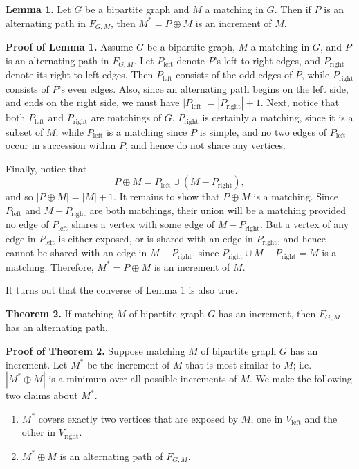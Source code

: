 \documentclass [12pt]{article}
\theoremstyle{definition}
\begin{document}
{\bf Lemma 1.} Let $G$ be a bipartite graph and $M$ a matching in $G$. Then if $P$ is an alternating path in $F_{G,M}$, then $M^{*}=P\oplus M$ is an increment of $M$.

{\bf Proof of Lemma 1.} Assume $G$ be a bipartite graph, $M$ a matching in $G$, and $P$ is an alternating path in $F_{G,M}$. 
 Let $P_{\mbox{left}}$ denote $P$'s left-to-right edges, and $P_{\mbox{right}}$ denote
its right-to-left edges. Then $P_{\mbox{left}}$ consists of the odd edges of $P$, while $P_{\mbox{right}}$ consists of $P$'s even edges. Also,
since an alternating path begins on the left side, and ends on the
right side, we must have  $|P_{\mbox{left}}|=|P_{\mbox{right}}|+1$. Next, notice that both $P_{\mbox{left}}$ and $P_{\mbox{right}}$ are matchings of $G$.  $P_{\mbox{right}}$ is certainly   a
matching, since it is  a subset of $M$, while $P_{\mbox{left}}$ is a matching since $P$ is simple, and no two edges of  $P_{\mbox{left}}$ occur in succession within $P$, and hence do not share any vertices.

Finally, notice that 
\[P\oplus M=P_{\mbox{left}}\cup (M-P_{\mbox{right}}),\]
and so $|P\oplus M|=|M|+1$. 
It remains to show that $P\oplus M$ is a matching. Since $P_{\mbox{left}}$ and $M-P_{\mbox{right}}$ are both matchings, their union will be a matching provided no edge of 
$P_{\mbox{left}}$ shares a vertex with some edge of  $M-P_{\mbox{right}}$. But a vertex of any edge in $P_{\mbox{left}}$ is either exposed, or is shared with an edge in $P_{\mbox{right}}$, and hence
cannot be shared with an edge in $M-P_{\mbox{right}}$, since $P_{\mbox{right}}\cup M-P_{\mbox{right}}=M$ is a matching. 
Therefore, $M^{*}=P\oplus M$ is an increment of $M$.

It turns out that the converse of Lemma 1 is also true.

{\bf Theorem 2.} If matching $M$ of bipartite graph $G$ has an increment, then  $F_{G,M}$ has an alternating path.

{\bf Proof of Theorem 2.} Suppose matching $M$ of bipartite graph $G$ has an increment. Let  $M^{*}$ be the increment of $M$ that is most similar to $M$; i.e. 
$|M^{*}\oplus M|$ is a minimum over all possible increments of $M$. We make the following two claims about $M^{*}$.

\begin{enumerate}
\item $M^{*}$ covers exactly two vertices that are exposed by $M$, one in $V_{\mbox{left}}$ and the other in $V_{\mbox{right}}$.
\item $M^{*}\oplus M$ is an alternating path of  $F_{G,M}$.
\end{enumerate}
\end{document}
